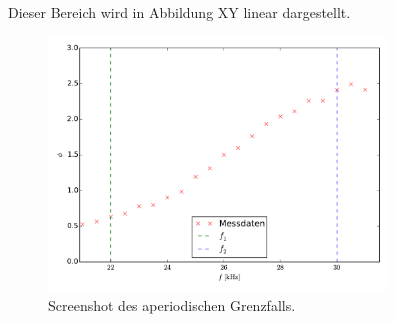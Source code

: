 Dieser Bereich wird in Abbildung XY linear dargestellt.
\begin{figure}[h]
		\centering
		\includegraphics[width=0.8\textwidth]{build/plot_phase_linear.pdf}
		\caption{Screenshot des aperiodischen Grenzfalls.}
\end{figure}

